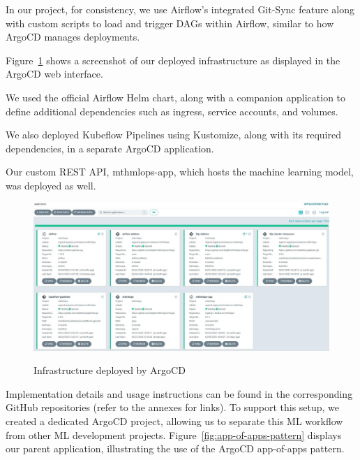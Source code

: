 In our project, for consistency, we use Airflow’s integrated Git-Sync feature along with custom scripts to load and trigger DAGs within Airflow,
similar to how ArgoCD manages deployments.

Figure~\ref{fig:argocd-infra} shows a screenshot of our deployed infrastructure as displayed in the ArgoCD web interface.

We used the official Airflow Helm chart, along with a companion application to define additional dependencies such as ingress, service accounts, and volumes.

We also deployed Kubeflow Pipelines using Kustomize, along with its required dependencies, in a separate ArgoCD application.

Our custom REST API, mthmlops-app, which hosts the machine learning model, was deployed as well.

\begin{figure}[!htbp]
    \centering
    \caption{Infrastructure deployed by ArgoCD}
    \includegraphics[width=\textwidth]{images/project/argocd-deployments}
    \label{fig:argocd-infra}
\end{figure}

Implementation details and usage instructions can be found in the corresponding GitHub repositories (refer to the annexes for links).
To support this setup, we created a dedicated ArgoCD project, allowing us to separate this ML workflow from other ML development projects.
Figure~\ref{fig:app-of-apps-pattern} displays our parent application, illustrating the use of the ArgoCD app-of-apps pattern.

